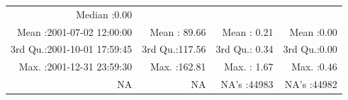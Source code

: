 \documentclass[
  10pt,
  a4paper,oneside]{article}
\begin{document}
\begin{longtable}[]{@{}rrrr@{}}
\begin{minipage}[t]{0.18\columnwidth}
Median :0.00\strut
\end{minipage}\tabularnewline
\begin{minipage}[t]{0.34\columnwidth}\raggedleft
Mean :2001-07-02 12:00:00\strut
\end{minipage} & \begin{minipage}[t]{0.19\columnwidth}\raggedleft
Mean : 89.66\strut
\end{minipage} & \begin{minipage}[t]{0.18\columnwidth}\raggedleft
Mean : 0.21\strut
\end{minipage} & \begin{minipage}[t]{0.18\columnwidth}\raggedleft
Mean :0.00\strut
\end{minipage}\tabularnewline
\begin{minipage}[t]{0.34\columnwidth}\raggedleft
3rd Qu.:2001-10-01 17:59:45\strut
\end{minipage} & \begin{minipage}[t]{0.19\columnwidth}\raggedleft
3rd Qu.:117.56\strut
\end{minipage} & \begin{minipage}[t]{0.18\columnwidth}\raggedleft
3rd Qu.: 0.34\strut
\end{minipage} & \begin{minipage}[t]{0.18\columnwidth}\raggedleft
3rd Qu.:0.00\strut
\end{minipage}\tabularnewline
\begin{minipage}[t]{0.34\columnwidth}\raggedleft
Max. :2001-12-31 23:59:30\strut
\end{minipage} & \begin{minipage}[t]{0.19\columnwidth}\raggedleft
Max. :162.81\strut
\end{minipage} & \begin{minipage}[t]{0.18\columnwidth}\raggedleft
Max. : 1.67\strut
\end{minipage} & \begin{minipage}[t]{0.18\columnwidth}\raggedleft
Max. :0.46\strut
\end{minipage}\tabularnewline
\begin{minipage}[t]{0.34\columnwidth}\raggedleft
NA\strut
\end{minipage} & \begin{minipage}[t]{0.19\columnwidth}\raggedleft
NA\strut
\end{minipage} & \begin{minipage}[t]{0.18\columnwidth}\raggedleft
NA's :44983\strut
\end{minipage} & \begin{minipage}[t]{0.18\columnwidth}\raggedleft
NA's :44982\strut
\end{minipage}\tabularnewline
\bottomrule
\end{longtable}
\end{document}
